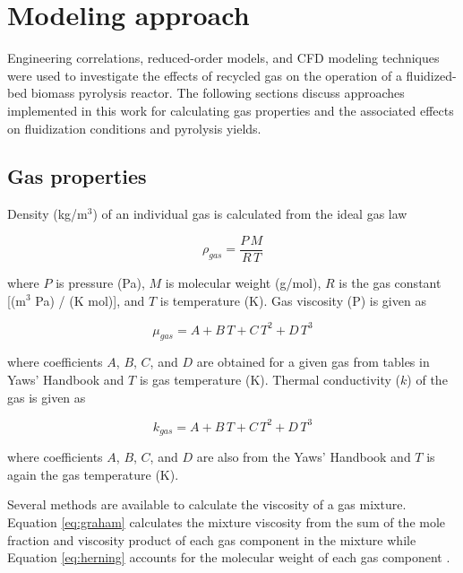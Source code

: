 
\section{Modeling approach}

Engineering correlations, reduced-order models, and CFD modeling techniques were used to investigate the effects of recycled gas on the operation of a fluidized-bed biomass pyrolysis reactor. The following sections discuss approaches implemented in this work for calculating gas properties and the associated effects on fluidization conditions and pyrolysis yields.

\subsection{Gas properties}

Density (kg/m$^3$) of an individual gas is calculated from the ideal gas law

\begin{equation}
    \rho_{gas} = \frac{P\,M}{R\,T}
\end{equation}

\noindent where $P$ is pressure (Pa), $M$ is molecular weight (g/mol), $R$ is the gas constant [(m$^3$ Pa) / (K mol)], and $T$ is temperature (K). Gas viscosity (\textmugreek P) is given as

\begin{equation}
    \mu_{gas} = A + B\,T + C\,T^2 + D\,T^3
\end{equation}

\noindent where coefficients $A$, $B$, $C$, and $D$ are obtained for a given gas from tables in Yaws' Handbook and $T$ is gas temperature (K). Thermal conductivity ($k$) of the gas is given as

\begin{equation}
    k_{gas} = A + B\,T + C\,T^2 + D\,T^3
\end{equation}

\noindent where coefficients $A$, $B$, $C$, and $D$ are also from the Yaws' Handbook and $T$ is again the gas temperature (K).

Several methods are available to calculate the viscosity of a gas mixture. Equation \ref{eq:graham} calculates the mixture viscosity from the sum of the mole fraction and viscosity product of each gas component in the mixture \cite{Graham-1846} while Equation \ref{eq:herning} accounts for the molecular weight of each gas component \cite{Herning-1936}.

